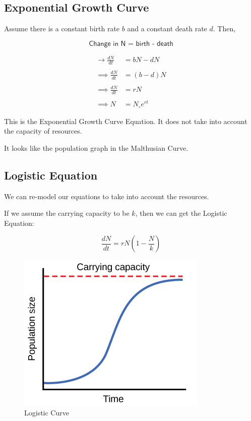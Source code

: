 \documentclass[twocolumn]{article}
\begin{document}
\subsection{Exponential Growth Curve}

Assume there is a constant birth rate $b$ and a constant death rate $d$. Then,

\[ 
    \textsf{Change in N = birth - death}    
\]

\begin{align*}
    \longrightarrow \frac{dN}{dt} &= bN - dN \\\\
    \implies \frac{dN}{dt}    &= (b-d)N \\\\
    \implies \frac{dN}{dt}    &= rN \\\\
    \implies N                &= N_{\circ}e^{rt}
\end{align*}

This is the Exponential Growth Curve Equation. It does not take into account the capacity of resources.

It looks like the population graph in the Malthusian Curve.

\subsection{Logistic Equation}

We can re-model our equations to take into account the resources. 

If we assume the carrying capacity to be $k$, then we can get the Logistic Equation:

\[
    \frac{dN}{dt} = rN \left( 1-\frac{N}{k} \right)    
\]

\begin{figure}[h]
\includegraphics[width = \linewidth]{Logistic.jpg}
\caption{Logistic Curve}
\end{figure}
\end{document}
